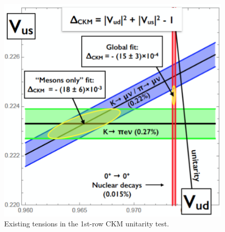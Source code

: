 \begin{figure}[t!]
\centering
\includegraphics[scale=0.8]{sections/figures/fig-ckm.png}
\caption{Existing tensions in the 1st-row CKM unitarity test.}
\label{fig:CKM}
\end{figure}

